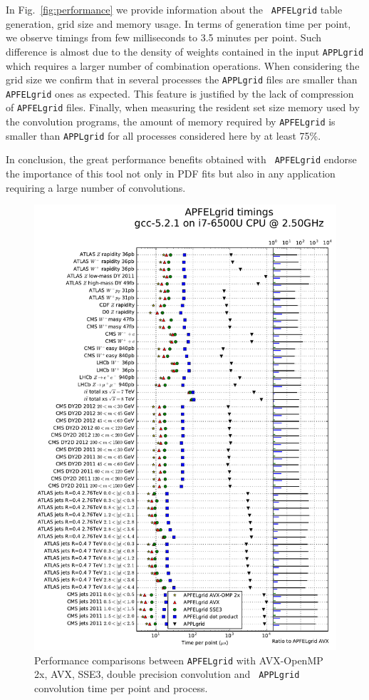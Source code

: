 \documentclass[preprint,12pt]{elsarticle}
\begin{document}
In Fig.~\ref{fig:performance} we provide information about the {\tt
  APFELgrid} table generation, grid size and memory usage. In terms of
generation time per point, we observe timings from few milliseconds to
3.5 minutes per point. Such difference is almost due to the density of
weights contained in the input {\tt APPLgrid} which requires a larger
number of combination operations. When considering the grid size we
confirm that in several processes the {\tt APPLgrid} files are smaller
than {\tt APFELgrid} ones as expected. This feature is justified by
the lack of compression of {\tt APFELgrid} files. Finally, when
measuring the resident set size memory used by the convolution
programs, the amount of memory required by {\tt APFELgrid} is smaller
than {\tt APPLgrid} for all processes considered here by at least
75\%.

In conclusion, the great performance benefits obtained with {\tt
  APFELgrid} endorse the importance of this tool not only in PDF fits
but also in any application requiring a large number of convolutions.

\begin{figure}
  \centering
  \includegraphics[scale=0.6]{plots/t0a}
\caption{\small Performance comparisons between {\tt APFELgrid} with
  AVX-OpenMP 2x, AVX, SSE3, double precision convolution and {\tt
    APPLgrid} convolution time per point and process.}
\label{fig:timings}
\end{figure}
\end{document}
